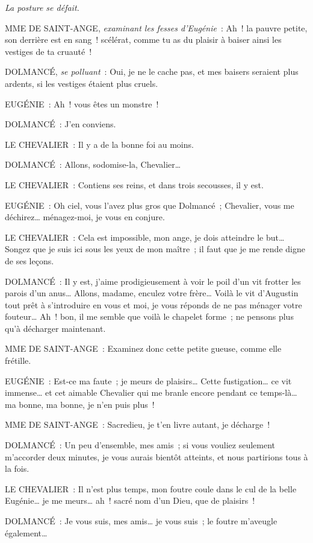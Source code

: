 \documentclass[french,twoside]{book} %
\begin{document}
{\itshape La posture se défait.}\par
MME DE SAINT-ANGE, {\itshape examinant les fesses d’Eugénie} : Ah ! la pauvre petite, son derrière est en sang ! scélérat, comme tu as du plaisir à baiser ainsi les vestiges de ta cruauté !\par
DOLMANCÉ, {\itshape se polluant} : Oui, je ne le cache pas, et mes baisers seraient plus ardents, si les vestiges étaient plus cruels.\par
EUGÉNIE : Ah ! vous êtes un monstre !\par
DOLMANCÉ : J’en conviens.\par
LE CHEVALIER : Il y a de la bonne foi au moins.\par
DOLMANCÉ : Allons, sodomise-la, Chevalier…\par
LE CHEVALIER : Contiens ses reins, et dans trois secousses, il y est.\par
EUGÉNIE : Oh ciel, vous l’avez plus gros que Dolmancé ; Chevalier, vous me déchirez… ménagez-moi, je vous en conjure.\par
LE CHEVALIER : Cela est impossible, mon ange, je dois atteindre le but… Songez que je suis ici sous les yeux de mon maître ; il faut que je me rende digne de ses leçons.\par
DOLMANCÉ : Il y est, j’aime prodigieusement à voir le poil d’un vit frotter les parois d’un anus… Allons, madame, enculez votre frère… Voilà le vit d’Augustin tout prêt à s’introduire en vous et moi, je vous réponds de ne pas ménager votre fouteur… Ah ! bon, il me semble que voilà le chapelet forme ; ne pensons plus qu’à décharger maintenant.\par
MME DE SAINT-ANGE : Examinez donc cette petite gueuse, comme elle frétille.\par
EUGÉNIE : Est-ce ma faute ; je meurs de plaisirs… Cette fustigation… ce vit immense… et cet aimable Chevalier qui me branle encore pendant ce temps-là… ma bonne, ma bonne, je n’en puis plus !\par
MME DE SAINT-ANGE : Sacredieu, je t’en livre autant, je décharge !\par
DOLMANCÉ : Un peu d’ensemble, mes amis ; si vous vouliez seulement m’accorder deux minutes, je vous aurais bientôt atteints, et nous partirions tous à la fois.\par
LE CHEVALIER : Il n’est plus temps, mon foutre coule dans le cul de la belle Eugénie… je me meurs… ah ! sacré nom d’un Dieu, que de plaisirs !\par
DOLMANCÉ : Je vous suis, mes amis… je vous suis ; le foutre m’aveugle également…\par
\end{document}
